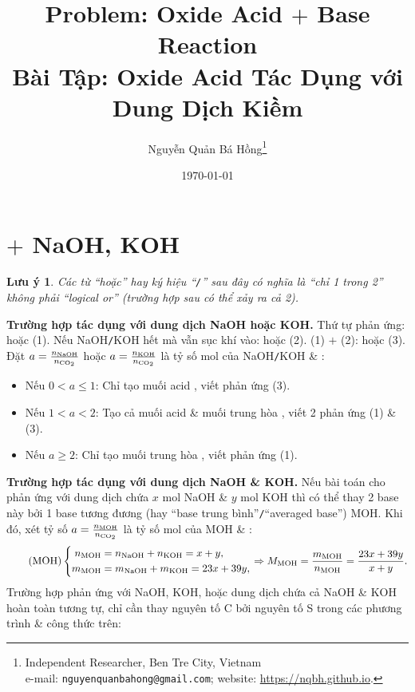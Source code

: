 \documentclass{article}
\title{Problem: Oxide Acid $+$ Base Reaction\\Bài Tập: Oxide Acid Tác Dụng với Dung Dịch Kiềm}
\author{Nguyễn Quản Bá Hồng\footnote{Independent Researcher, Ben Tre City, Vietnam\\e-mail: \texttt{nguyenquanbahong@gmail.com}; website: \url{https://nqbh.github.io}.}}
\date{\today}
\newtheorem{luuy}{Lưu ý}
\begin{document}
\maketitle
\tableofcontents


\section{ $+$ NaOH, KOH}

\begin{luuy}
	Các từ ``hoặc'' hay ký hiệu ``{\tt/}'' sau đây có nghĩa là ``chỉ 1 trong 2'' không phải ``logical or'' (trường hợp sau có thể xảy ra cả 2).
\end{luuy}

\noindent\textbf{\textsf{Trường hợp  tác dụng với dung dịch NaOH hoặc KOH.}} Thứ tự phản ứng:  hoặc  (1). Nếu NaOH{\tt/}KOH hết mà vẫn sục khí  vào:  hoặc  (2). (1) $+$ (2):  hoặc  (3). Đặt $a = \frac{n_{\rm NaOH}}{n_{\ce{CO2}}}$ hoặc $a = \frac{n_{\rm KOH}}{n_{\ce{CO2}}}$ là tỷ số mol của NaOH{\tt/}KOH \& :
\begin{itemize}
	\item Nếu $0 < a\le 1$: Chỉ tạo muối acid , viết phản ứng (3).
	\item Nếu $1 < a < 2$: Tạo cả muối acid  \& muối trung hòa , viết 2 phản ứng (1) \& (3).
	\item Nếu $a\ge 2$: Chỉ tạo muối trung hòa , viết phản ứng (1).
\end{itemize}
\textbf{\textsf{Trường hợp  tác dụng với dung dịch NaOH \& KOH.}} Nếu bài toán cho  phản ứng với dung dịch chứa $x$ mol NaOH \& $y$ mol KOH thì có thể thay 2 base này bởi 1 base tương đương (hay ``base trung bình''{\tt/}``averaged base'') MOH. Khi đó, xét tỷ số $a = \frac{n_{\rm MOH}}{n_{\ce{CO2}}}$ là tỷ số mol của MOH \& :
\begin{equation}
	\label{MOH}
	\tag{MOH}
	\left\{\begin{split}
		n_{\rm MOH} &= n_{\rm NaOH} + n_{\rm KOH} = x + y,\\
		m_{\rm MOH} &= m_{\rm NaOH} + m_{\rm KOH} = 23x + 39y,
	\end{split}\right.\Rightarrow M_{\rm MOH} = \frac{m_{\rm MOH}}{n_{\rm MOH}} = \frac{23x + 39y}{x + y}.
\end{equation}
Trường hợp  phản ứng với NaOH, KOH, hoặc dung dịch chứa cả NaOH \& KOH hoàn toàn tương tự, chỉ cần thay nguyên tố C bởi nguyên tố S trong các phương trình \& công thức trên:
\vspace{2mm}
\end{document}

